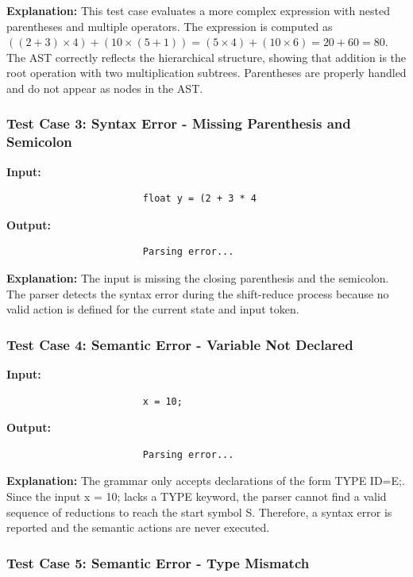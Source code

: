 \documentclass[letterpaper,12pt,oneside]{article}
\begin{document}
\textbf{Explanation:} This test case evaluates a more complex expression with nested parentheses and multiple operators. The expression is computed as \( ((2 + 3) \times 4) + (10 \times (5 + 1)) = (5 \times 4) + (10 \times 6) = 20 + 60 = 80 \). The AST correctly reflects the hierarchical structure, showing that addition is the root operation with two multiplication subtrees. Parentheses are properly handled and do not appear as nodes in the AST.

\subsubsection{Test Case 3: Syntax Error - Missing Parenthesis and Semicolon}

\textbf{Input:}
\begin{verbatim}
						float y = (2 + 3 * 4
\end{verbatim}

\noindent\textbf{Output:}
\begin{verbatim}
						Parsing error...
\end{verbatim}

\textbf{Explanation:} The input is missing the closing parenthesis and the semicolon. The parser detects the syntax error during the shift-reduce process because no valid action is defined for the current state and input token.

\subsubsection{Test Case 4: Semantic Error - Variable Not Declared}

\textbf{Input:}
\begin{verbatim}
						x = 10;
\end{verbatim}

\noindent\textbf{Output:}
\begin{verbatim}
						Parsing error...
\end{verbatim}

\textbf{Explanation:} The grammar only accepts declarations of the form TYPE ID=E;. Since the input x = 10; lacks a TYPE keyword, the parser cannot find a valid sequence of reductions to reach the start symbol S. Therefore, a syntax error is reported and the semantic actions are never executed.

\subsubsection{Test Case 5: Semantic Error - Type Mismatch}
\end{document}
